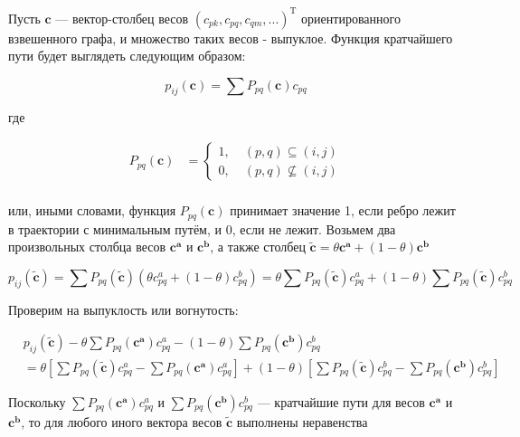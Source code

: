 	Пусть $\mathbf{c}$ --- вектор-столбец весов $(c_{pk}, c_{pq}, c_{qm},
	...)^{\text{T}}$ ориентированного взвешенного графа, и множество таких весов - выпуклое. Функция кратчайшего пути
	будет выглядеть следующим образом:
	
	\begin{equation}
	p_{ij}(\mathbf{c}) = \sum P_{pq}(\mathbf{c}) c_{pq}
	\end{equation}
	
	где 
	
	
	\begin{align}
	P_{pq}(\mathbf{c}) &=
	\left\{
	\begin{aligned}
	1 ,\; & (p,q) \subseteq (i,j) \\
	0 ,\; & (p,q) \nsubseteq (i,j)
	\end{aligned}
	\right. \\
	\end{align}
	
	или, иными словами, функция $P_{pq}(\mathbf{c})$ принимает значение 1, если
	ребро лежит в траектории с минимальным путём, и 0, если не лежит. Возьмем два
	произвольных столбца весов $\mathbf{c^a}$ и $\mathbf{c^b}$, а также столбец
	$\mathbf{\tilde{c}} = \theta \mathbf{c^a} + (1-\theta)\mathbf{c^b}$
	
	\begin{equation}
	p_{ij}(\mathbf{\tilde{c}}) = \sum P_{pq}(\mathbf{\tilde{c}}) (\theta c_{pq}^a +
	(1 - \theta) c_{pq}^b) = \theta \sum P_{pq}(\mathbf{\tilde{c}}) c_{pq}^a + (1 -
	\theta) \sum P_{pq}(\mathbf{\tilde{c}})  c_{pq}^b 
	\end{equation}
	
	Проверим на выпуклость или вогнутость:
	
	\begin{equation}
	\begin{split}
	&p_{ij}(\mathbf{\tilde{c}}) - \theta \sum P_{pq}(\mathbf{c^a}) c_{pq}^a - (1 -
	\theta) \sum P_{pq}(\mathbf{c^b})  c_{pq}^b \\
	&= \theta \left[ \sum P_{pq}(\mathbf{\tilde{c}}) c_{pq}^a - \sum
	P_{pq}(\mathbf{c^a}) c_{pq}^a \right]  + (1 - \theta) \left[ \sum
	P_{pq}(\mathbf{\tilde{c}}) c_{pq}^b - \sum P_{pq}(\mathbf{c^b}) c_{pq}^b\right] 
	\end{split}
	\end{equation}
	
	Поскольку $\sum P_{pq}(\mathbf{c^a}) c_{pq}^a$ и $\sum P_{pq}(\mathbf{c^b})
	c_{pq}^b$ --- кратчайшие пути для весов $\mathbf{c^a}$ и $\mathbf{c^b}$, то для
	любого иного вектора весов $\mathbf{\tilde{c}}$ выполнены неравенства
	
